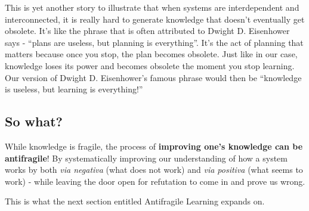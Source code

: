 This is yet another story to illustrate that when systems are interdependent and interconnected, it is really hard to generate knowledge that doesn't eventually get obsolete. It's like the phrase that is often attributed to Dwight D. Eisenhower says - ``plans are useless, but planning is everything''. It's the act of planning that matters because once you stop, the plan becomes obsolete. Just like in our case, knowledge loses its power and becomes obsolete the moment you stop learning. Our version of Dwight D. Eisenhower's famous phrase would then be ``knowledge is useless, but learning is everything!''

\subsection{So what?}
While knowledge is fragile, the process of \textbf{improving one's knowledge can be antifragile}!
By systematically improving our understanding of how a system works by both \emph{via negativa} (what does not work) and \emph{via positiva} (what seems to work) - while leaving the door open for refutation to come in and prove us wrong.

This is what the next section entitled Antifragile Learning expands on.